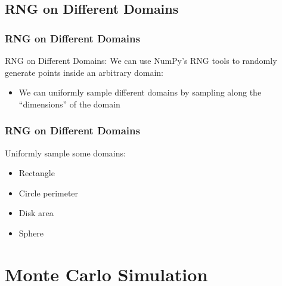 \documentclass{beamer}
\begin{document}
\subsection{RNG on Different Domains}

\begin{frame}	
	\frametitle{RNG on Different Domains}
	
	\begin{block}{RNG on Different Domains:}
		We can use NumPy's RNG tools to randomly generate points inside an arbitrary domain:
		\begin{itemize}
			\item We can uniformly sample different domains by sampling along the ``dimensions'' of the domain
		\end{itemize}
	\end{block}
	
\end{frame}

\begin{frame}	
	\frametitle{RNG on Different Domains}
	
	\begin{exampleblock}{Uniformly sample some domains:}
		\begin{itemize}
			\item Rectangle
			\item Circle perimeter
			\item Disk area
			\item Sphere
		\end{itemize}
	\end{exampleblock}
	
\end{frame}


\section{Monte Carlo Simulation}

\begin{frame}	
\end{frame}
\end{document}
